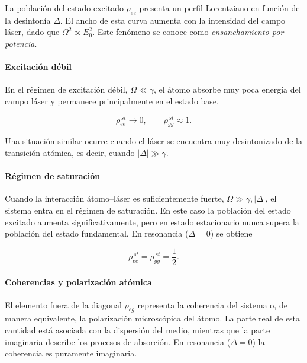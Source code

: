 \documentclass[11pt]{report}
\begin{document}
La población del estado excitado $\rho_{ee}$ presenta un perfil Lorentziano en función de la desintonía $\Delta$. El ancho de esta curva aumenta con la intensidad del campo láser, dado que $\Omega^2 \propto E_0^2$. Este fenómeno se conoce como \textit{ensanchamiento por potencia}.

\paragraph{Excitación débil}

En el régimen de excitación débil, $\Omega \ll \gamma$, el átomo absorbe muy poca energía del campo láser y permanece principalmente en el estado base,

\begin{equation}
\rho^{\,st}_{ee} \rightarrow 0,
\qquad
\rho^{\,st}_{gg} \approx 1.
\end{equation}

Una situación similar ocurre cuando el láser se encuentra muy desintonizado de la transición atómica, es decir, cuando $|\Delta| \gg \gamma$.

\paragraph{Régimen de saturación}

Cuando la interacción átomo--láser es suficientemente fuerte, $\Omega \gg \gamma, |\Delta|$, el sistema entra en el régimen de saturación. En este caso la población del estado excitado aumenta significativamente, pero en estado estacionario nunca supera la población del estado fundamental. En resonancia ($\Delta=0$) se obtiene

\begin{equation}
\rho^{\,st}_{ee}=\rho^{\,st}_{gg}=\frac{1}{2}.
\end{equation}

\paragraph{Coherencias y polarización atómica}

El elemento fuera de la diagonal $\rho_{eg}$ representa la coherencia del sistema o, de manera equivalente, la polarización microscópica del átomo. La parte real de esta cantidad está asociada con la dispersión del medio, mientras que la parte imaginaria describe los procesos de absorción. En resonancia ($\Delta=0$) la coherencia es puramente imaginaria.
\end{document}
